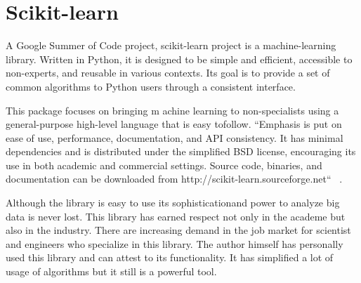 \section{Scikit-learn}

A Google Summer of Code project, scikit-learn project is a
machine-learning library.  Written in Python, it is designed to be
simple and efficient, accessible to non-experts, and reusable in
various contexts. Its goal is to provide a set of common algorithms to
Python users through a consistent interface.

This package focuses on bringing m achine learning to non-specialists
using a general-purpose high-level language that is easy tofollow.
``Emphasis is put on ease of use, performance, documentation, and API
consistency.  It has minimal dependencies and is distributed under the
simplified BSD license, encouraging its use in both academic and
commercial settings. Source code, binaries, and documentation can be
downloaded from http://scikit-learn.sourceforge.net``
~\cite{hid-sp18-506-Scikit-learn}.

	
Although the library is easy to use its sophisticationand power to
analyze big data is never lost. This library has earned respect not
only in the academe but also in the industry. There are increasing
demand in the job market for scientist and engineers who specialize in
this library. The author himself has personally used this library and
can attest to its functionality. It has simplified a lot of usage of
algorithms but it still is a powerful tool.
